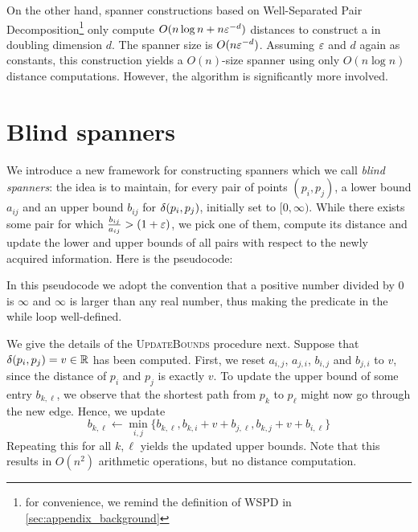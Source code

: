On the other hand, spanner constructions based on Well-Separated Pair Decomposition\footnote{ 
for convenience, we remind the definition of WSPD in \cref{sec:appendix_background}} only compute
$O(n\log n+n \varepsilon^{-d})$ distances 
to construct a \espanner in doubling dimension $d$.
The spanner size is $O(n\varepsilon^{-d})$. Assuming $\varepsilon$ and $d$ again as constants,
this construction yields a $O(n)$-size spanner using only $O(n\log n)$ distance
computations. However, the algorithm is significantly more involved.

\section{Blind spanners}
%
We introduce a new framework for constructing spanners
which we call \emph{blind spanners}: the idea is to maintain,
for every pair of points $(p_i,p_j)$,
a lower bound $a_{ij}$ and an upper bound $b_{ij}$ for $\delta(p_i,p_j)$,
initially set to $[0,\infty)$. While there exists some pair for which $\frac{b_{ij}}{a_{ij}}>(1+\varepsilon)$,
we pick one of them, compute its distance and update the lower and upper bounds of
all pairs with respect to the newly acquired information. Here is the pseudocode:

\begin{algorithmic}
\label{alg:blind_spanner}
     
    \State {}
    \EndWhile
\EndFunction
\end{algorithmic}


In this pseudocode we adopt the convention that a positive number divided by 0 is $\infty$
and $\infty$ is larger than any real number,
thus making the predicate in the while loop well-defined.  

We give the details of the \textsc{UpdateBounds} procedure next.
Suppose that
$\delta(p_i,p_j)=v\in\mathbb{R}$ has been computed.
First, we reset $a_{i,j}$, $a_{j,i}$, $b_{i,j}$ and $b_{j,i}$ to $v$, since the distance
of $p_i$ and $p_j$ is exactly $v$.
To update the upper bound of some entry $b_{k,\ell}$,
we observe that the shortest path from $p_k$ to $p_\ell$ might now
go through the new edge. Hence, we update
\[
    b_{k,\ell}\gets \min_{i,j}\{b_{k,\ell},b_{k,i}+v+b_{j,\ell},b_{k,j}+v+b_{i,\ell}\}
\]
Repeating this for all $k,\ell$ yields the updated upper bounds.
Note that this results in $O(n^2)$ arithmetic operations,
but no distance computation.

